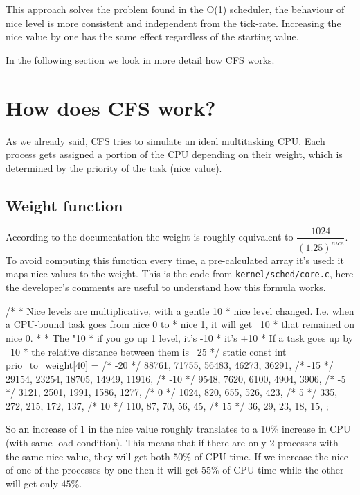 \documentclass[10pt]{book}
\begin{document}
This approach solves the problem found in the O(1) scheduler, the behaviour of nice level is more consistent and independent from the tick-rate. Increasing the nice value by one has the same effect regardless of the starting value.

In the following section we look in more detail how CFS works.

\section{How does CFS work?} 

As we already said, CFS tries to simulate an ideal multitasking CPU. Each process gets assigned a portion of the CPU depending on their weight, which is determined by the priority of the task (nice value).

\subsection{Weight function}
According to the documentation the weight is roughly equivalent to $\dfrac{1024}{(1.25)^{nice}}$. To avoid computing this function every time, a pre-calculated array it's used: it maps nice values to the weight. This is the code from \verb|kernel/sched/core.c|, here the developer's comments are useful to understand how this formula works.
\begin{code}
/*
 * Nice levels are multiplicative, with a gentle 10%
 * nice level changed. I.e. when a CPU-bound task goes from nice 0 to
 * nice 1, it will get ~10%
 * that remained on nice 0.
 *
 * The "10%
 * if you go up 1 level, it's -10%
 * it's +10%
 * If a task goes up by ~10%
 * the relative distance between them is ~25%
 */
static const int prio_to_weight[40] = {
/* -20 */ 88761, 71755, 56483, 46273, 36291,
/* -15 */ 29154, 23254, 18705, 14949, 11916,
/* -10 */ 9548, 7620, 6100, 4904, 3906,
/* -5 */ 3121, 2501, 1991, 1586, 1277,
/* 0 */ 1024, 820, 655, 526, 423,
/* 5 */ 335, 272, 215, 172, 137,
/* 10 */ 110, 87, 70, 56, 45,
/* 15 */ 36, 29, 23, 18, 15,
};
\end{code}
So an increase of 1 in the nice value roughly translates to a 10\% increase in CPU (with same load condition).%
This means that if there are only 2 processes with the same nice value, they will get both $50\%$ of CPU time. If we increase the nice of one of the processes by one then it will get $55\%$ of CPU time while the other will get only $45\%$.
\end{document}
